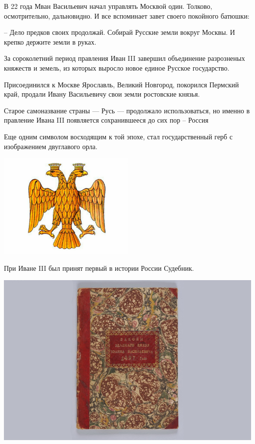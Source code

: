 	В 22 года Мван Васильевич начал управлять Москвой один. Толково, осмотрительно, дальновидно. И все вспоминает завет своего покойного батюшки:

	-- Дело предков своих продолжай. Собирай Русские земли вокруг Москвы. И крепко держите земли в руках.



	За сороколетний период правления Иван III завершил объединение разрозненых княжеств и земель, из которых выросло новое единое Русское государство.

	Присоединился к Москве Ярославль, Великий Новгород, покорился Пермский край, продали Ивану Васильевичу свои земли ростовские князья.


			Старое самоназвание страны --- Русь --- продолжало использоваться, но именно в правление Ивана III появляется сохранившееся до сих пор -- Россия

			Еще одним символом восходящим к той эпохе, стал государственный герб с изображением двуглавого орла.
    \begin{center}
	\includegraphics[width=0.5\textwidth]{images/ivan2-2}
    \end{center}



\newpage
	При Иване III был принят первый в истории России Судебник.

    \begin{center}
	\includegraphics[width=0.5\textheight]{images/ivan2-3}
    \end{center}




